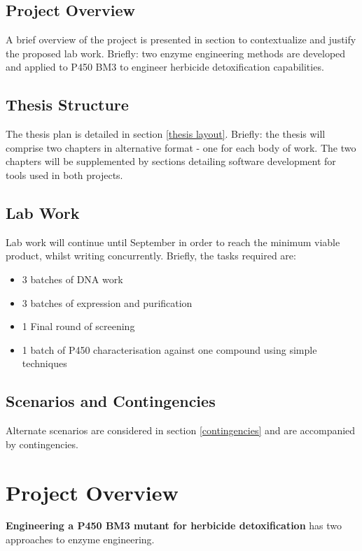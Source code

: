 \documentclass{article}
\begin{document}
\subsection{Project Overview}
A brief overview of the project is presented in section  to contextualize and justify the proposed lab work. Briefly: two enzyme engineering methods are developed and applied to P450 BM3 to engineer herbicide detoxification capabilities.

\subsection{Thesis Structure}
The thesis plan is detailed in section \ref{thesis layout}. Briefly: the thesis will comprise two chapters in alternative format - one for each body of work. The two chapters will be supplemented by sections detailing software development for tools used in both projects. 

\subsection{Lab Work} %
Lab work will continue until September in order to reach the minimum viable product, whilst writing concurrently. Briefly, the tasks required are:
\begin{itemize}
	\item 3 batches of DNA work
	\item 3 batches of expression and purification
	\item 1 Final round of screening 
	\item 1 batch of P450 characterisation against one compound using simple techniques 
\end{itemize}

\subsection{Scenarios and Contingencies} %
Alternate scenarios are considered in section \ref{contingencies} and are accompanied by contingencies.

\section{Project Overview} 
\textbf{Engineering a P450 BM3 mutant for herbicide detoxification} has two approaches to enzyme engineering.
\end{document}
